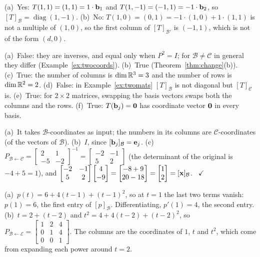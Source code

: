 \documentclass[11pt]{article}
\begin{document}
\begin{description}[leftmargin=0pt,itemsep=5pt]
  \item[Knowledge Check \ref{kc:kcdiag}.] (a)~Yes: $T(1,1)=(1,1)=1\cdot\mathbf{b}_1$ and $T(1,-1)=(-1,1)=-1\cdot\mathbf{b}_2$, so $[T]_{\mathcal{B}}=\operatorname{diag}(1,-1)$. (b)~No: $T(1,0)=(0,1)=-1\cdot(1,0)+1\cdot(1,1)$ is not a multiple of $(1,0)$, so the first column of $[T]_{\mathcal{B}'}$ is $(-1,1)$, which is not of the form $(d,0)$.
  \item[Knowledge Check \ref{kc:kctf}.] (a)~False: they are inverses, and equal only when $P^2=I$; for $\mathcal{B}\ne\mathcal{C}$ in general they differ (Example~\ref{ex:twocoords}). (b)~True (Theorem~\ref{thm:change}(b)). (c)~True: the number of columns is $\dim\mathbb{R}^3=3$ and the number of rows is $\dim\mathbb{R}^2=2$. (d)~False: in Example~\ref{ex:twomats} $[T]_{\mathcal{B}}$ is not diagonal but $[T]_{\mathcal{C}}$ is. (e)~True: for $2\times2$ matrices, swapping the basis vectors swaps both the columns and the rows. (f)~True: $T(\mathbf{b}_j)=\mathbf{0}$ has coordinate vector $\mathbf{0}$ in every basis.
  \item[Pause and think \ref{think:arrow}.] (a)~It takes $\mathcal{B}$-coordinates as input; the numbers in its columns are $\mathcal{C}$-coordinates (of the vectors of $\mathcal{B}$). (b)~$I$, since $[\mathbf{b}_j]_{\mathcal{B}}=\mathbf{e}_j$. (c)~$P_{\mathcal{B}\leftarrow\mathcal{C}}=\begin{bmatrix}2&1\\-5&-2\end{bmatrix}^{-1}=\begin{bmatrix}-2&-1\\5&2\end{bmatrix}$ (the determinant of the original is $-4+5=1$), and $\begin{bmatrix}-2&-1\\5&2\end{bmatrix}\begin{bmatrix}4\\-9\end{bmatrix}=\begin{bmatrix}-8+9\\20-18\end{bmatrix}=\begin{bmatrix}1\\2\end{bmatrix}=[\mathbf{x}]_{\mathcal{B}}$. \ $\checkmark$
  \item[Pause and think \ref{think:taylorthink}.] (a)~$p(t)=6+4(t-1)+(t-1)^2$, so at $t=1$ the last two terms vanish: $p(1)=6$, the first entry of $[p]_{\mathcal{B}}$. Differentiating, $p'(1)=4$, the second entry. (b)~$t=2+(t-2)$ and $t^2=4+4(t-2)+(t-2)^2$, so $P_{\mathcal{B}\leftarrow\mathcal{E}}=\begin{bmatrix}1&2&4\\0&1&4\\0&0&1\end{bmatrix}$. The columns are the coordinates of $1$, $t$ and $t^2$, which come from expanding each power around $t=2$.

\end{description}
\end{document}
